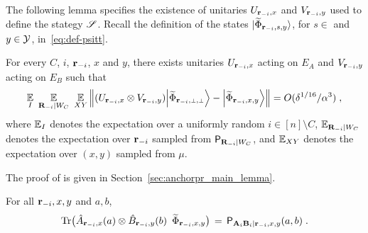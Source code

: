 The following lemma specifies the existence of unitaries $U_{\mathbf{r}_{-i},x}$ and $V_{\mathbf{r}_{-i},y}$ used to define the stategy $\mathscr{S}$. Recall the definition of the states ${|\widetilde{\Phi}_{\mathbf{r}_{-i},s,y}\rangle}$, for $s\in $ and $y\in \mathcal{Y}$, in~\eqref{eq:def-psitt}.
	

\begin{lemma}
\label{lem:local_unitaries}
	For every $C$, $i$, $\mathbf{r}_{-i}$, $x$ and $y$, there exists unitaries $U_{\mathbf{r}_{-i},x}$ acting on $E_A$ and $V_{\mathbf{r}_{-i},y}$ acting on $E_B$ such that
	$$
		\Ex_I \,\, \Ex_{\bR_\mi | W_C} \,\, \Ex_{XY}  \Big \| (U_{\br_\mi,x} \otimes V_{\br_\mi,y}) \bigket{\wt{\Phi}_{\sspp}} - \bigket{\wt{\Phi}_{\ssxy}} \Big\| = O(\delta^{1/16}/\alpha^3)\;,
	$$
	where $\operatorname*{\mathbb{E}}_I$ denotes the expectation over a uniformly random $i \in [n] \setminus C$, $\operatorname*{\mathbb{E}}_{\mathbf{R}_{-i} | W_C}$ denotes the expectation over $\mathbf{r}_{-i}$ sampled from $\mathsf{P}_{\mathbf{R}_{-i} | W_C}$, and $\operatorname*{\mathbb{E}}_{XY}$ denotes the expectation over $(x,y)$ sampled from $\mu$. 
\end{lemma}

The proof of  is given in Section~\ref{sec:anchorpr_main_lemma}. 

\begin{claim}\label{claim:main-1}
For all $\mathbf{r}_{-i}, x,y$ and $a,b$,
\begin{equation}\label{eq:anchorpr_main-2}
\mbox{\rm Tr} \big ( \hat{A}_{\mathbf{r}_{-i}, x}(a) \otimes \hat{B}_{\mathbf{r}_{-i}, y}(b) \,\,\,\widetilde{\Phi}_{{\mathbf{r}_{-i} , x,y}} \big )  \,=\,\mathsf{P}_{\mathbf{A}_i \mathbf{B}_i | \mathbf{r}_{-i},x,y}(a,b)\;.
\end{equation}
\end{claim}

